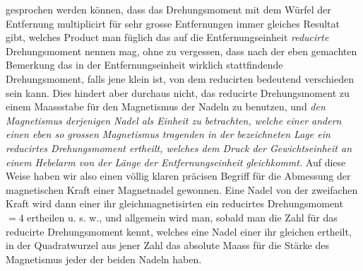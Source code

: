 \noindent gesprochen werden können, dass das Drehungsmoment mit dem Würfel der Entfernung multiplicirt für sehr grosse Entfernungen immer gleiches Resultat gibt, welches Product man füglich das auf die Entfernungseinheit \textit{reducirte} Drehungsmoment nennen mag, ohne zu vergessen, dass nach der eben gemachten Bemerkung das in der Entfernungseinheit wirklich stattfindende Drehungsmoment, falls jene klein ist, von dem reducirten bedeutend verschieden sein kann. Dies hindert aber durchaus nicht, das reducirte Drehungsmoment zu einem Maassstabe für den Magnetismus der Nadeln zu benutzen, und \textit{den Magnetismus derjenigen Nadel als Einheit zu betrachten, welche einer andern einen eben so grossen Magnetismus tragenden in der bezeichneten Lage ein reducirtes Drehungsmoment ertheilt, welches dem Druck der Gewichtseinheit an einem Hebelarm von der Länge der Entfernungseinheit gleichkommt.} Auf diese Weise haben wir also einen völlig klaren präcisen Begriff für die Abmessung der magnetischen Kraft einer Magnetnadel gewonnen. Eine Nadel von der zweifachen Kraft wird dann einer ihr gleichmagnetisirten ein reducirtes Drehungsmoment $=4$ ertheilen u. s. w., und allgemein wird man, sobald man die Zahl für das reducirte Drehungsmoment kennt, welches eine Nadel einer ihr gleichen ertheilt, in der Quadratwurzel aus jener Zahl das absolute Maass für die Stärke des Magnetismus jeder der beiden Nadeln haben.


